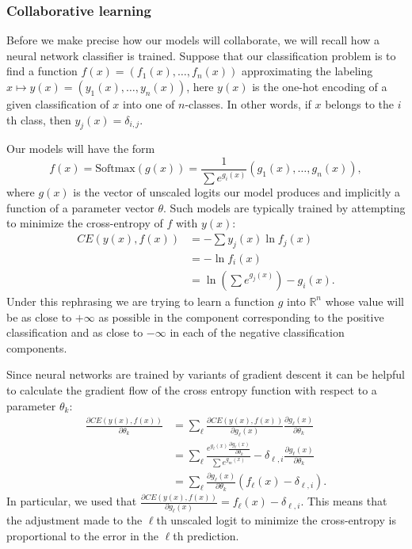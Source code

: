 \documentclass[english,a4paper,oneside]{amsart}
\theoremstyle{definition}
\begin{document}
\subsubsection{Collaborative learning}\label{sec:collab}
Before we make precise how our models will collaborate, we will recall how a neural network classifier is trained. Suppose that our classification problem is to find a function $f(x)=(f_1(x),\dots, f_n(x))$ approximating the labeling $x \mapsto y(x)=(y_1(x),\dots, y_n(x))$, here $y(x)$ is the one-hot encoding of a given classification of $x$ into one of $n$-classes. In other words, if $x$ belongs to the $i$th class, then $y_j(x)=\delta_{i,j}$. 

Our models will have the form \[f(x)=\textrm{Softmax}(g(x))=\frac{1}{\sum e^{g_i(x)}}(g_1(x),\dots, g_n(x)),\] where $g(x)$ is the vector of unscaled logits our model produces and implicitly a function of a parameter vector $\theta$. Such models are typically trained by attempting to minimize the cross-entropy of $f$ with $y(x)$:
\begin{align*}
CE(y(x), f(x)) &= - \sum y_j(x) \ln f_j(x)\\
&=-\ln f_i(x)\\
&=\ln(\sum e^{g_j(x)})-g_i(x).
\end{align*} 
Under this rephrasing we are trying to learn a function $g$ into $\mathbb{R}^n$ whose value will be as close to $+\infty$ as possible in the component corresponding to the positive classification and as close to $-\infty$ in each of the negative classification components. 

Since neural networks are trained by variants of gradient descent it can be helpful to calculate the gradient flow of the cross entropy function with respect to a parameter $\theta_k$:
\begin{align*}
 \frac{\partial CE(y(x), f(x))}{\partial \theta_k} &= \sum_\ell \frac{\partial CE(y(x), f(x))}{\partial g_\ell(x)} \frac{\partial g_\ell(x)}{\partial \theta_k} \\
 &=\sum_\ell \frac{e^{g_\ell(x)} \frac{\partial g_\ell(x)}{\partial \theta_k}}{\sum e^{g_m(x)}}-\delta_{\ell, i} \frac{\partial g_\ell(x)}{\partial \theta_k} \\
 &= \sum_\ell \frac{\partial g_\ell(x)}{\partial \theta_k}(f_\ell(x)-\delta_{\ell, i}).
 \end{align*}
 In particular, we used that $\frac{\partial CE(y(x), f(x))}{\partial g_\ell(x)}=f_\ell(x)-\delta_{\ell, i}.$ This means that the adjustment made to the $\ell$th unscaled logit to minimize the cross-entropy is proportional to the error in the $\ell$th prediction. 
\end{document}

